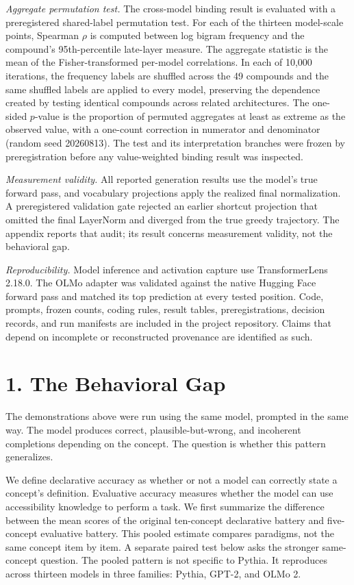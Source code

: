 \documentclass[
  english,
]{article}
\begin{document}
\emph{Aggregate permutation test.} The cross-model binding result is evaluated with a preregistered shared-label permutation test. For each of the thirteen model-scale points, Spearman \(\rho\) is computed between log bigram frequency and the compound's 95th-percentile late-layer measure. The aggregate statistic is the mean of the Fisher-transformed per-model correlations. In each of 10,000 iterations, the frequency labels are shuffled across the 49 compounds and the same shuffled labels are applied to every model, preserving the dependence created by testing identical compounds across related architectures. The one-sided \(p\)-value is the proportion of permuted aggregates at least as extreme as the observed value, with a one-count correction in numerator and denominator (random seed 20260813). The test and its interpretation branches were frozen by preregistration before any value-weighted binding result was inspected.

\emph{Measurement validity.} All reported generation results use the model's true forward pass, and vocabulary projections apply the realized final normalization. A preregistered validation gate rejected an earlier shortcut projection that omitted the final LayerNorm and diverged from the true greedy trajectory. The appendix reports that audit; its result concerns measurement validity, not the behavioral gap.

\emph{Reproducibility.} Model inference and activation capture use TransformerLens 2.18.0. The OLMo adapter was validated against the native Hugging Face forward pass and matched its top prediction at every tested position. Code, prompts, frozen counts, coding rules, result tables, preregistrations, decision records, and run manifests are included in the project repository. Claims that depend on incomplete or reconstructed provenance are identified as such.

\section{1. The Behavioral Gap}\label{the-behavioral-gap}

The demonstrations above were run using the same model, prompted in the same way. The model produces correct, plausible-but-wrong, and incoherent completions depending on the concept. The question is whether this pattern generalizes.

We define declarative accuracy as whether or not a model can correctly state a concept's definition. Evaluative accuracy measures whether the model can use accessibility knowledge to perform a task. We first summarize the difference between the mean scores of the original ten-concept declarative battery and five-concept evaluative battery. This pooled estimate compares paradigms, not the same concept item by item. A separate paired test below asks the stronger same-concept question. The pooled pattern is not specific to Pythia. It reproduces across thirteen models in three families: Pythia, GPT-2, and OLMo 2.
\end{document}
